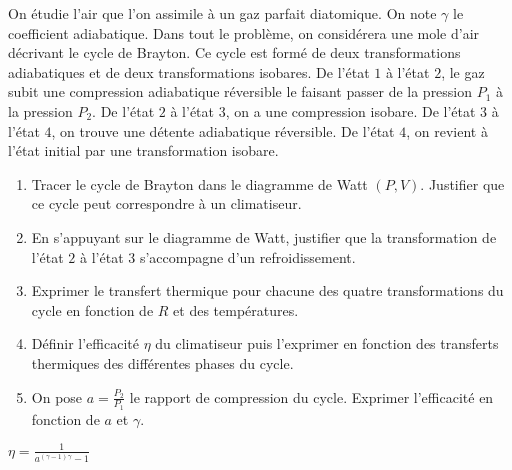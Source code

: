 On étudie l'air que l'on assimile à un gaz parfait diatomique. On note $\gamma$ le coefficient adiabatique. Dans tout le problème, on considérera une mole d'air décrivant le cycle de Brayton. Ce cycle est formé de deux transformations adiabatiques et de deux transformations isobares. De l'état $1$ à l'état $2$, le gaz subit une compression adiabatique réversible le faisant passer de la pression $P_1$ à la pression $P_2$. De l'état $2$ à l'état $3$, on a une compression isobare. De l'état $3$ à l'état $4$, on trouve une détente adiabatique réversible. De l'état $4$, on revient à l'état initial par une transformation isobare.

\begin{enumerate}
	\item Tracer le cycle de Brayton dans le diagramme de Watt $(P, V)$. Justifier que ce cycle peut correspondre à un climatiseur.
	\item En s'appuyant sur le diagramme de Watt, justifier que la transformation de l'état $2$ à l'état $3$ s'accompagne d'un refroidissement.
	\item Exprimer le transfert thermique pour chacune des quatre transformations du cycle en fonction de $R$ et des températures.
	\item Définir l'efficacité $\eta$ du climatiseur puis l'exprimer en fonction des transferts thermiques des différentes phases du cycle.
	\item On pose $a = \frac{P_2}{P_1}$ le rapport de compression du cycle. Exprimer l'efficacité en fonction de $a$ et $\gamma$. 
\end{enumerate}

 $\eta = \frac{1}{a^{(\gamma-1)\gamma}-1}$